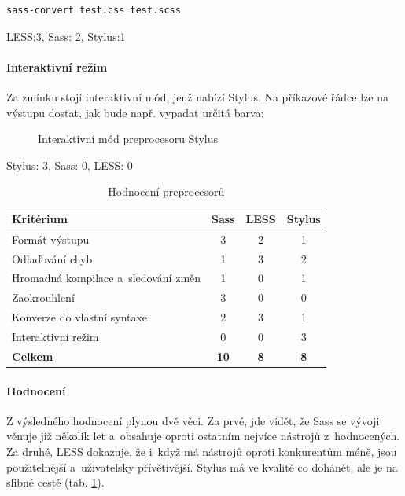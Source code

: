 \documentclass[thesis=B,czech]{FITthesis}[2012/06/26]
\begin{document}
\scriptsize
\begin{verbatim}
sass-convert test.css test.scss
\end{verbatim}
\normalsize
LESS:3, \gls{Sass}: 2, Stylus:1
\paragraph{Interaktivní režim}

 Za zmínku stojí interaktivní mód, jenž nabízí Stylus. Na příkazové řádce lze na výstupu dostat, jak bude např. vypadat určitá barva:
\begin{figure}[h]
	\begin{center}
	\end{center}
	\caption{Interaktivní mód preprocesoru Stylus}
	\label{imgStyl2}
\end{figure}

\noindent Stylus: 3, \gls{Sass}: 0, LESS: 0



\begin{table}\centering
 	\caption[Hodnocení preprocesorů]{Hodnocení preprocesorů}\label{tab:pre}
 	\begin{tabular}{|l|c|c|c|}\hline
	\textbf{Kritérium} & \textbf{Sass} & \textbf{LESS} & \textbf{Stylus} \tabularnewline	
 	\hline\hline
		 Formát výstupu & 3 & 2 & 1\tabularnewline\hline
		 Odlaďování chyb & 1 & 3 & 2\tabularnewline\hline
		 Hromadná kompilace a~sledování změn & 1 & 0 & 1\tabularnewline\hline
		 Zaokrouhlení & 3 & 0 & 0\tabularnewline\hline
		 Konverze do vlastní syntaxe & 2 & 3 & 1\tabularnewline\hline
		 Interaktivní režim  & 0 & 0 & 3\tabularnewline\hline
		 \textbf{Celkem} & \textbf{10} & \textbf{8} & \textbf{8}\tabularnewline\hline
 	\end{tabular}
\end{table} 


\paragraph{Hodnocení}

Z výsledného hodnocení plynou dvě věci. Za prvé, jde vidět, že \gls{Sass} se vývoji věnuje již několik let a~obsahuje oproti ostatním nejvíce nástrojů z~hodnocených. Za druhé, LESS dokazuje, že i~když má nástrojů oproti konkurentům méně, jsou použitelnější a~uživatelsky přívětivější. Stylus má ve kvalitě co dohánět, ale je na slibné cestě (tab. \ref{tab:pre}).
\end{document}
